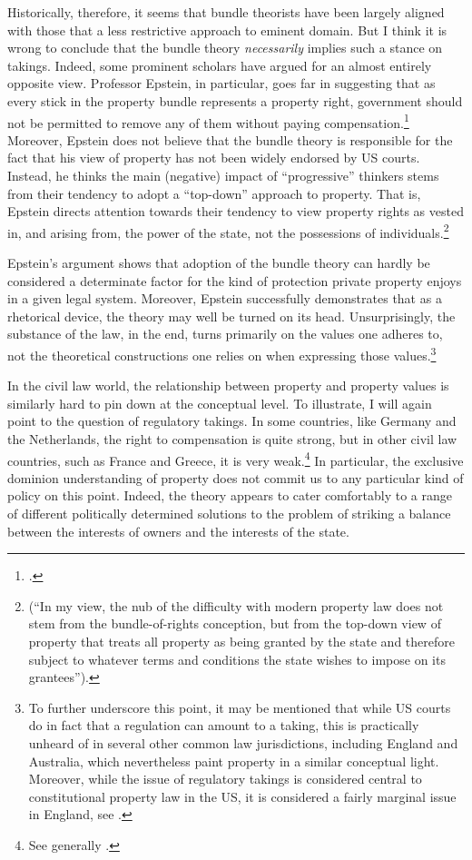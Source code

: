 Historically, therefore, it seems that bundle theorists have been largely aligned with those that  a less restrictive approach to eminent domain. But I think it is wrong to conclude that the bundle theory {\it necessarily} implies such a stance on takings. Indeed, some prominent scholars have argued for an almost entirely opposite view. Professor Epstein, in particular, goes far in suggesting that as every stick in the property bundle represents a property right, government should not be permitted to remove any of them without paying compensation.\footcite[232-233]{epstein11} Moreover, Epstein does not believe that the bundle theory is responsible for the fact that his view of property has not been widely endorsed by US courts. Instead, he thinks the main (negative) impact of ``progressive'' thinkers stems from their tendency to adopt a ``top-down'' approach to property. That is, Epstein directs attention towards their tendency to view property rights as vested in, and arising from, the power of the state, not the possessions of individuals.\footnote{\cite[227-228]{epstein11} (``In my view, the nub of the difficulty with modern property law does not stem from the bundle-of-rights conception, but from the top-down view of property that treats all property as being granted by the state and therefore subject to whatever terms and conditions the state wishes to impose on its grantees'').} 

Epstein's argument shows that adoption of the bundle theory can hardly be considered a determinate factor for the kind of protection private property enjoys in a given legal system. Moreover, Epstein successfully demonstrates that as a rhetorical device, the theory may well be turned on its head. Unsurprisingly, the substance of the law, in the end, turns primarily on the values one adheres to, not the theoretical constructions one relies on when expressing those values.\footnote{To further underscore this point, it may be mentioned that while US courts do in fact  that a regulation can amount to a taking, this is practically unheard of in several other common law jurisdictions, including England and Australia, which nevertheless paint property in a similar conceptual light. Moreover, while the issue of regulatory takings is considered central to constitutional property law in the US, it is considered a fairly marginal issue in England, see \cite{purdue10}.}

In the civil law world, the relationship between property  and property values is similarly hard to pin down at the conceptual level. To illustrate, I will again point to the question of regulatory takings. In some countries, like Germany and the Netherlands, the right to compensation is quite strong, but in other civil law countries, such as France and Greece, it is very weak.\footnote{See generally \cite{alterman10}.} In particular, the exclusive dominion understanding of property does not commit us to any particular kind of policy on this point. Indeed, the theory appears to cater comfortably to a range of different politically determined solutions to the problem of striking a balance between the interests of owners and the interests of the state. 

